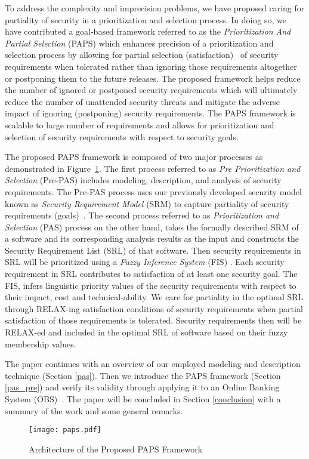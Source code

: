 To address the complexity and imprecision problems, we have proposed caring for partiality of security in a prioritization and selection process. In doing so, we have contributed a goal-based framework referred to as the \textit{Prioritization And Partial Selection} (PAPS) which enhances precision of a prioritization and selection process by allowing for partial selection (satisfaction)~\cite{mougouei2015partial} of security requirements when tolerated rather than ignoring those requirements altogether or postponing them to the future releases. The proposed framework helps reduce the number of ignored or postponed security requirements which will ultimately reduce the number of unattended security threats and mitigate the adverse impact of ignoring (postponing) security requirements. The PAPS framework is scalable to large number of requirements and allows for prioritization and selection of security requirements with respect to security goals. 

The proposed PAPS framework is composed of two major processes as demonstrated in Figure~\ref{fig_paps}. The first process referred to as \textit{Pre Prioritization and Selection} (Pre-PAS) includes modeling, description, and analysis of security requirements. The Pre-PAS process uses our previously developed security model known as \textit{Security Requirement Model} (SRM) \cite{mougouei2013goal} to capture partiality of security requirements (goals)~\cite{loer2006integrated}. The second process referred to as \textit{Prioritization and Selection} (PAS) process on the other hand, takes the formally described SRM of a software and its corresponding analysis results as the input and constructs the Security Requirement List (SRL) of that software. Then security requirements in SRL will be prioritized using a \textit{Fuzzy Inference System} (FIS) \cite{klir1995fuzzy}. Each security requirement in SRL contributes to satisfaction of at least one security goal. The FIS, infers linguistic priority values of the security requirements with respect to their impact, cost and technical-ability. We care for partiality in the optimal SRL through RELAX-ing \cite{whittle2010relax} satisfaction conditions of security requirements when partial satisfaction of those requirements is tolerated. Security requirements then will be RELAX-ed and included in the optimal SRL of software based on their fuzzy membership values.
 
The paper continues with an overview of our employed modeling and description technique (Section \ref{pas}). Then we introduce the PAPS framework (Section \ref{pas_pre}) and verify its validity through applying it to an Online Banking System (OBS)~\cite{mougouei2013goal}. The paper will be concluded in Section \ref{conclusion} with a summary of the work and some general remarks.  

\begin{figure}[h!]
	\centering
	\centerline{\texttt{[image: paps.pdf]}}
	\caption{Architecture of the Proposed PAPS Framework}
	\label{fig_paps}
\end{figure}
